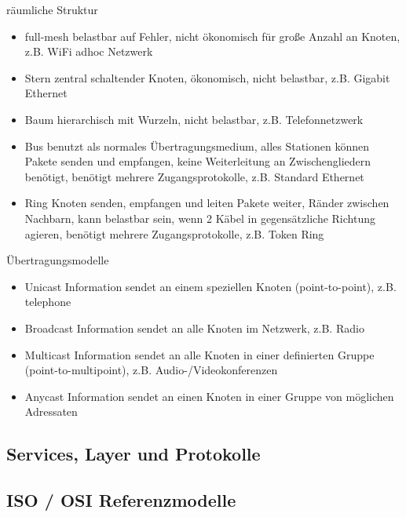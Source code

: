 \documentclass[paper=a4, fontsize=11pt]{scrartcl}
\numberwithin{equation}{section}
\numberwithin{figure}{section}
\numberwithin{table}{section}
\begin{document}
räumliche Struktur
\begin{itemize}
\item full-mesh 
belastbar auf Fehler, nicht ökonomisch für große Anzahl an Knoten, z.B. WiFi adhoc Netzwerk
\item Stern
zentral schaltender Knoten, ökonomisch, nicht belastbar, z.B. Gigabit Ethernet
\item Baum
hierarchisch mit Wurzeln, nicht belastbar, z.B. Telefonnetzwerk
\item Bus
benutzt als normales Übertragungsmedium, alles Stationen können Pakete senden und empfangen, keine Weiterleitung an Zwischengliedern benötigt, benötigt mehrere Zugangsprotokolle, z.B. Standard Ethernet
\item Ring
Knoten senden, empfangen und leiten Pakete weiter, Ränder zwischen Nachbarn, kann belastbar sein, wenn 2 Käbel in gegensätzliche Richtung agieren, benötigt mehrere Zugangsprotokolle, z.B. Token Ring
\end{itemize}

Übertragungsmodelle
\begin{itemize}
\item Unicast
Information sendet an einem speziellen Knoten (point-to-point), z.B. telephone
\item Broadcast
Information sendet an alle Knoten im Netzwerk, z.B. Radio
\item Multicast
Information sendet an alle Knoten in einer definierten Gruppe (point-to-multipoint), z.B. Audio-/Videokonferenzen
\item Anycast
Information sendet an einen Knoten in einer Gruppe von möglichen Adressaten
\end{itemize}


\subsection{Services, Layer und Protokolle}


\subsection{ISO / OSI Referenzmodelle}

\end{document}
